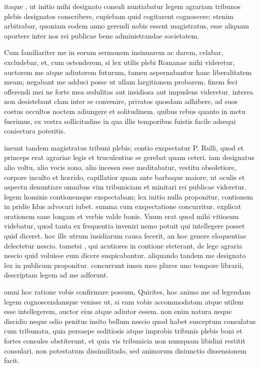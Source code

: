  itaque , ut initio mihi designato consuli nuntiabatur legem agrariam tribunos plebis designatos conscribere, cupiebam quid cogitarent cognoscere; etenim arbitrabar, quoniam eodem anno gerendi nobis essent magistratus, esse aliquam oportere inter nos rei publicae bene administrandae societatem.

 Cum familiariter me in eorum sermonem insinuarem ac darem, celabar, excludebar, et, cum ostenderem, si lex utilis plebi Romanae mihi videretur, auctorem me atque adiutorem futurum, tamen aspernabantur hanc liberalitatem meam; negabant me adduci posse ut ullam largitionem probarem. finem feci offerendi mei ne forte mea sedulitas aut insidiosa aut impudens videretur. interea non desistebant clam inter se convenire, privatos quosdam adhibere, ad suos coetus occultos noctem adiungere et solitudinem. quibus rebus quanto in metu fuerimus, ex vestra sollicitudine in qua illis temporibus fuistis facile adsequi coniectura poteritis.

 ineunt tandem magistratus tribuni plebis; contio exspectatur P. Rulli, quod et princeps erat agrariae legis et truculentius se gerebat quam ceteri. iam designatus alio voltu, alio vocis sono, alio incessu esse meditabatur, vestitu obsoletiore, corpore inculto et horrido, capillatior quam ante barbaque maiore, ut oculis et aspectu denuntiare omnibus vim tribuniciam et minitari rei publicae videretur. legem hominis contionemque exspectabam; lex initio nulla proponitur, contionem in pridie Idus advocari iubet. summa cum exspectatione concurritur. explicat orationem sane longam et verbis valde bonis. Vnum erat quod mihi vitiosum videbatur, quod tanta ex frequentia inveniri nemo potuit qui intellegere posset quid diceret. hoc ille utrum insidiarum causa fecerit, an hoc genere eloquentiae delectetur nescio. tametsi , qui acutiores in contione steterant, de lege agraria nescio quid voluisse eum dicere suspicabantur. aliquando tandem me designato lex in publicum proponitur. concurrunt iussu meo plures uno tempore librarii, descriptam legem ad me adferunt.

 omni hoc ratione vobis confirmare possum, Quirites, hoc animo me ad legendam legem cognoscendamque venisse ut, si eam vobis accommodatam atque utilem esse intellegerem, auctor eius atque adiutor essem. non enim natura neque discidio neque odio penitus insito bellum nescio quod habet susceptum consulatus cum tribunatu, quia persaepe seditiosis atque improbis tribunis plebis boni et fortes consules obstiterunt, et quia vis tribunicia non numquam libidini restitit consulari. non potestatum dissimilitudo, sed animorum disiunctio dissensionem facit.

